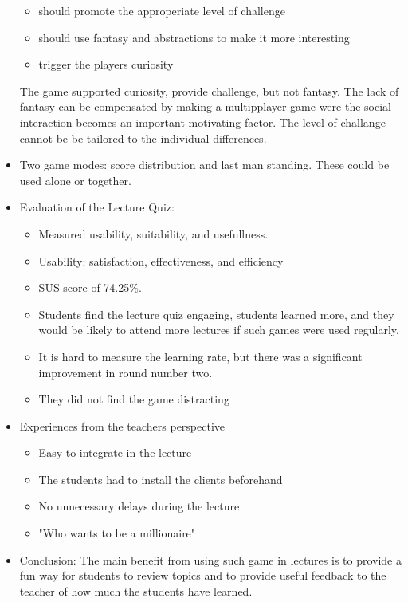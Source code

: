 \begin{itemize}
      \begin{itemize}
          \item should promote the approperiate level of challenge
          \item should use fantasy and abstractions to make it more interesting
          \item trigger the players curiosity
      \end{itemize}
      The game supported curiosity, provide challenge, but not fantasy. The lack of fantasy can be compensated by making a multipplayer game were the social interaction becomes an important motivating factor. The level of challange cannot be be tailored to the individual differences.
    \item Two game modes: score distribution and last man standing. These could be used alone or together.
    \item Evaluation of the Lecture Quiz:
      \begin{itemize}
        \item Measured usability, suitability, and usefullness.
        \item Usability: satisfaction, effectiveness, and efficiency
        \item SUS score of 74.25\%. 
        \item Students find the lecture quiz engaging, students learned more, and they would be likely to attend more lectures if such games were used regularly.
        \item It is hard to measure the learning rate, but there was a significant improvement in round number two.
        \item They did not find the game distracting
      \end{itemize}
    \item Experiences from the teachers perspective
      \begin{itemize}
        \item Easy to integrate in the lecture
        \item The students had to install the clients beforehand
        \item No unnecessary delays during the lecture 
        \item "Who wants to be a millionaire"
      \end{itemize}
    \item Conclusion: The main benefit from using such game in lectures is to provide a fun way for students to review topics and to provide useful feedback to the teacher of how much the students have learned.
  \end{itemize}